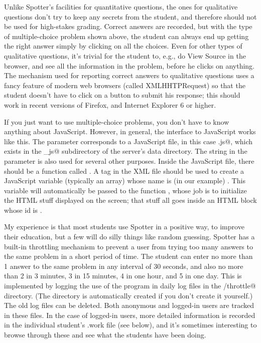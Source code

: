 \documentclass{doc}
\begin{document}
Unlike Spotter's facilities for
quantitative questions, the ones for qualitative questions don't try to keep
any secrets from the student, and therefore should not be used for high-stakes
grading. Correct answers are recorded, but with the type of multiple-choice
problem shown above, the student can always end up getting the right answer
simply by clicking on all the choices. Even for other types of qualitative
questions, it's trivial for the student to,
e.g., do View Source in the browser, and see all the information in
the problem, before
he clicks on anything. The mechanism used for reporting correct answers
to qualitative questions uses a fancy feature of modern web browsers (called
XMLHHTPRequest) so that the student doesn't have to click on a button
to submit his response; this should work in recent versions of Firefox,
and Internet Explorer 6 or higher.

If you just want to use multiple-choice problems, you don't have to know anything
about JavaScript. However, in general, the interface to JavaScript works like this. The \verb@type@
parameter corresponds to a JavaScript file, in this case \verb@mc.js@, which
exists in the \verb@spotter_js@ subdirectory of the server's data directory.
The string in the \verb@type@ parameter is also used for several other purposes.
Inside the JavaScript file, there should be a function called \verb@populate@.
A \verb@data@ tag in the XML file should be used to create a JavaScript variable
(typically an array) whose name is (in our example) \verb@mc@. This variable
will automatically be passed to the function \verb@populate@, whose job is to
initialize the HTML stuff displayed on the screen; that stuff all goes inside
an HTML \verb@div@ block whose id is \verb@container@.

\label{abuse}
My experience is that most students use Spotter in a positive way, to improve their
education, but a few will do silly things like random guessing. Spotter
has a built-in throttling mechanism to prevent a user from trying too many
answers to the same problem in a short period of time. The student can enter
no more than 1 answer to the same problem in any interval of 30 seconds, and also no more than 2
in 3 minutes, 3 in 15 minutes, 4 in one hour, and 5 in one day.
This is implemented by logging the use of the program in daily log files
in the \verb@spotter/throttle@ directory. (The directory is automatically created
if you don't create it yourself.) The old log files can be deleted. Both
anonymous and logged-in users are tracked in these files. In the case of
logged-in users, more detailed information is recorded in the individual
student's .work file (see below), and it's sometimes interesting to browse
through these and see what the students have been doing.
\end{document}
